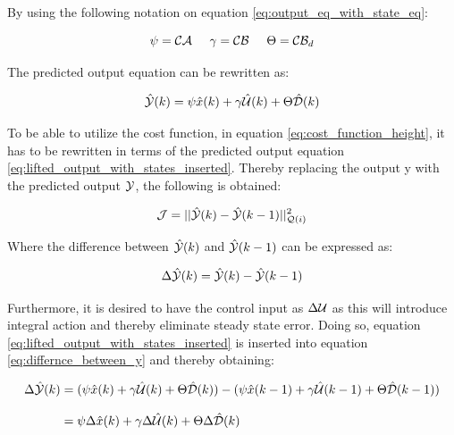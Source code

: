 By using the following notation on equation \ref{eq:output_eq_with_state_eq}:


\begin{equation}
 \psi = \CMcal{C}\CMcal{A}  \hspace{5mm} \gamma = \CMcal{C}\CMcal{B} \hspace{5mm}  \Theta = \CMcal{C}\CMcal{B}_{d}
\end{equation}

The predicted output equation can be rewritten as: 

\begin{equation}\label{eq:lifted_output_with_states_inserted}
	\hat{\CMcal{Y}}(k) = \psi \hat{x}(k) + \gamma \hat{\CMcal{U}}(k) + \Theta \hat{\CMcal{D}}(k)
\end{equation}



To be able to utilize the cost function, in equation \ref{eq:cost_function_height}, it has to be rewritten in terms of the predicted output equation \ref{eq:lifted_output_with_states_inserted}. Thereby replacing the output y with the predicted output $\CMcal{Y}$, the following is obtained:

\begin{equation}\label{eq:new_the_cost_function_yeah}
	\CMcal{J} = ||\hat{\CMcal{Y}}(k)-\hat{\CMcal{Y}}(k-1)||_{\CMcal{Q}(i)}^2
\end{equation}

Where the difference between $\hat{\CMcal{Y}}(k)$ and $\hat{\CMcal{Y}}(k-1)$ can be expressed as:

\begin{equation}\label{eq:differnce_between_y}
	\Delta \hat{\CMcal{Y}}(k) =\hat{\CMcal{Y}}(k)-\hat{\CMcal{Y}}(k-1) 
\end{equation}

Furthermore, it is desired to have the control input as $\Delta \CMcal{U}$ as this will introduce integral action and thereby eliminate steady state error. Doing so, equation \ref{eq:lifted_output_with_states_inserted} is inserted into equation \ref{eq:differnce_between_y} and thereby obtaining:

\begin{equation}\label{eq:delta_output_eq} \begin{aligned}
	\Delta \hat{\CMcal{Y}}(k) &= (\psi \hat{x}(k) + \gamma \hat{\CMcal{U}}(k) + \Theta \hat{\CMcal{D}}(k))-(\psi \hat{x}(k-1) + \gamma \hat{\CMcal{U}}(k-1) + \Theta \hat{\CMcal{D}}(k-1)) \\[8pt]
							  &= \psi\Delta \hat{x}(k) + \gamma\Delta \hat{\CMcal{U}}(k) + \Theta\Delta \hat{\CMcal{D}}(k)
	\end{aligned}
\end{equation}


